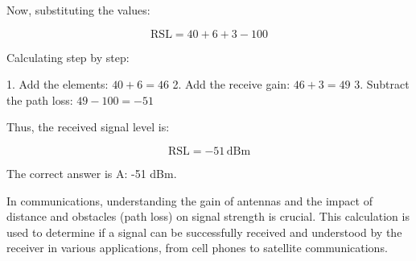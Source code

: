 Now, substituting the values:

\[
\text{RSL} = 40 + 6 + 3 - 100
\]

Calculating step by step:

1. Add the elements: \( 40 + 6 = 46 \)
2. Add the receive gain: \( 46 + 3 = 49 \)
3. Subtract the path loss: \( 49 - 100 = -51 \)

Thus, the received signal level is:

\[
\text{RSL} = -51 \, \text{dBm}
\]

The correct answer is A: -51 dBm.

In communications, understanding the gain of antennas and the impact of distance and obstacles (path loss) on signal strength is crucial. This calculation is used to determine if a signal can be successfully received and understood by the receiver in various applications, from cell phones to satellite communications.

